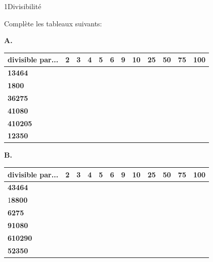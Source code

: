 {}

\begin{exercice}{1}{Divisibilité}

Complète les tableaux suivants:
\bigskip

\textbf{A.}
\bigskip


\begin{tabular}{|l|l|l|l|l|l|l|l|l|l|l|l|} 
\hline
\textbf{divisible par...} & \textbf{2} \; \; & \textbf{3} \; \; & \textbf{4} \; \; & \textbf{5}  \; \;& \textbf{6}  \; \;&  \textbf{9}  \; \;&  \textbf{10} \; \; &  \textbf{25} \; \; &  \textbf{50} \; \; &  \textbf{75} \; \; &  \textbf{100}  \\ 
\hline
\textbf{13464}            &           &           &           &            &  &  &    &    &    &    &      \\ 
\hline
\textbf{1800}            &           &            &           &           &   &   &   &   &   &    &     \\ 
\hline
\textbf{36275}            &            &            &            &           &   &   &    &   &    &   &      \\ 
\hline
\textbf{41080}            &           &            &           &           &   &   &   &    &    &    &      \\ 
\hline
\textbf{410205}           &            &           &            &           &   &   &    &    &    &    &      \\ 
\hline
\textbf{12350}            &           &            &            &           &   &   &   &   &  &    &      \\
\hline
\end{tabular}
\bigskip



\textbf{B.}
\bigskip

\begin{tabular}{|l|l|l|l|l|l|l|l|l|l|l|l|} 
\hline
\textbf{divisible par...} & \textbf{2} \; \; & \textbf{3} \; \; & \textbf{4} \; \; & \textbf{5}  \; \;& \textbf{6}  \; \;&  \textbf{9}  \; \;&  \textbf{10} \; \; &  \textbf{25} \; \; &  \textbf{50} \; \; &  \textbf{75} \; \; &  \textbf{100}  \\ \hline
\textbf{43464}            &           &           &           &            &  &   &    &    &    &    &      \\ 
\hline
1\textbf{8800}            &           &            &           &           &   &   &   &   &   &    &     \\ 
\hline
\textbf{6275}             &            &            &            &           &   &   &    &   &    &   &      \\ 
\hline
\textbf{91080}            &           &           &           &           &  &  &   &    &    &    &      \\ 
\hline
\textbf{610290}           &            &           &            &           &   &  &   &    &    &    &      \\ 
\hline
\textbf{52350}            &           &           &            &           &  &   &   &   &   &    &      \\
\hline
\end{tabular}
\bigskip
\bigskip


\end{exercice}
